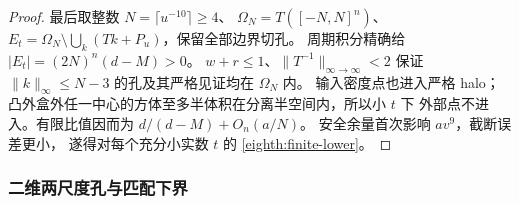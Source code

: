 \begin{proof}
最后取整数 \(N=\lceil u^{-10}\rceil\ge4\)、
\(\Omega_N=T([-N,N]^n)\)、
\(E_t=\Omega_N\setminus\bigcup_k(Tk+P_u)\)，保留全部边界切孔。
周期积分精确给 \(|E_t|=(2N)^n(d-M)>0\)。
\(w+r\le1\)、\(\|T^{-1}\|_{\infty\to\infty}<2\) 保证
\(\|k\|_\infty\le N-3\) 的孔及其严格见证均在 \(\Omega_N\) 内。
输入密度点也进入严格 halo；
凸外盒外任一中心的方体至多半体积在分离半空间内，所以小 \(t\) 下
外部点不进入。有限比值因而为
\(d/(d-M)+O_n(a/N)\)。
安全余量首次影响 \(av^9\)，截断误差更小，
遂得对每个充分小实数 \(t\) 的 \eqref{eighth:finite-lower}。
\end{proof}

\subsubsection{二维两尺度孔与匹配下界}

